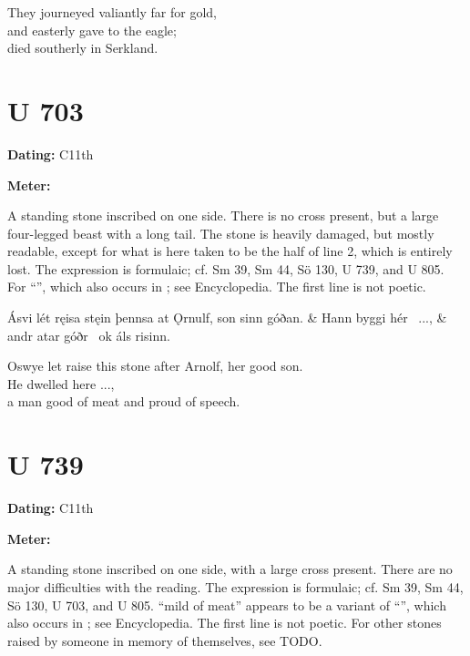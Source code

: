 \bvb They journeyed valiantly far for gold, \\
and easterly gave to the eagle; \\
died southerly in Serkland.\evb\evg

\sectionline

\section{U 703}

\begin{flushright}%
\textbf{Dating: }C11th

\textbf{Meter: }\Fornyrdislag
\end{flushright}%

A standing stone inscribed on one side.  There is no cross present, but a large four-legged beast with a long tail.  The stone is heavily damaged, but mostly readable, except for what is here taken to be the half of line 2, which is entirely lost.  The expression is formulaic; cf. Sm 39, Sm 44, Sö 130, U 739, and U 805.  For “”, which also occurs in \Havamal; see Encyclopedia.  The first line is not poetic.

\sectionline

\bvg\bva[]%
Ásvi lét ręisa stęin þennsa at Ǫrnulf, son sinn góðan. &
Hann byggi hér \hld\ ..., &
andr atar góðr \hld\ ok áls risinn.\eva

\bvb Oswye let raise this stone after Arnolf, her good son. \\
He dwelled here ..., \\
a man good of meat and proud of speech.\evb\evg

\sectionline

\section{U 739}

\begin{flushright}%
\textbf{Dating: }C11th

\textbf{Meter: }\Fornyrdislag
\end{flushright}%

A standing stone inscribed on one side, with a large cross present.  There are no major difficulties with the reading.  The expression is formulaic; cf. Sm 39, Sm 44, Sö 130, U 703, and U 805.  “mild of meat” appears to be a variant of “”, which also occurs in \Havamal; see Encyclopedia.  The first line is not poetic.  For other stones raised by someone in memory of themselves, see TODO.

